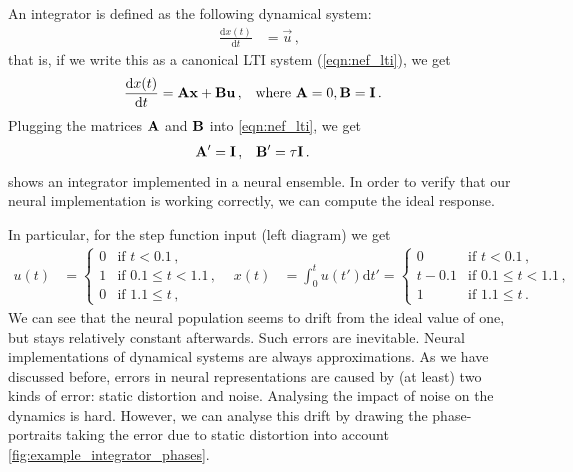 \documentclass[10pt,letterpaper,oneside]{article}
\begin{document}
An integrator is defined as the following dynamical system:
\begin{align*}
	\frac{\mathrm{d} x(t)}{\mathrm{d}t} &= \vec u \,,
\end{align*}
that is, if we write this as a canonical LTI system (\cref{eqn:nef_lti}), we get
\begin{align*}
	\frac{\mathrm{d} x(t)}{\mathrm{d}t} &= {\mathbf{A}} {\mathbf{x}} + {\mathbf{B}} {\mathbf{u}} \,, && \text{where } {\mathbf{A}} = 0, {\mathbf{B}} = {\mathbf{I}} \,.
\end{align*}
Plugging the matrices ${\mathbf{A}}$ and ${\mathbf{B}}$ into \cref{eqn:nef_lti}, we get
\begin{align*}
	{\mathbf{A}}' &= {\mathbf{I}} \,, & {\mathbf{B}}' &= \tau {\mathbf{I}} \,.
\end{align*}
 shows an integrator implemented in a neural ensemble. In order to verify that our neural implementation is working correctly, we can compute the ideal response.

In particular, for the step function input (left diagram) we get
\begin{align*}
	u(t) &= \begin{cases}
		0 & \text{if } t < 0.1 \,, \\
		1 & \text{if } 0.1 \leq t < 1.1 \,, \\
		0 & \text{if } 1.1 \leq t \,,
		\end{cases} &
	x(t) &= \int_{0}^t u(t') \mathrm{d}t' = \begin{cases}
		0 & \text{if } t < 0.1 \,, \\
		t - 0.1 & \text{if } 0.1 \leq t < 1.1 \,, \\
		1 & \text{if } 1.1 \leq t \,.
	\end{cases}
\end{align*}
We can see that the neural population seems to drift from the ideal value of one, but stays relatively constant afterwards. Such errors are inevitable. Neural implementations of dynamical systems are always approximations. As we have discussed before, errors in neural representations are caused by (at least) two kinds of error: static distortion and noise. Analysing the impact of noise on the dynamics is hard. However, we can analyse this drift by drawing the phase-portraits taking the error due to static distortion into account \cref{fig:example_integrator_phases}.
\end{document}
